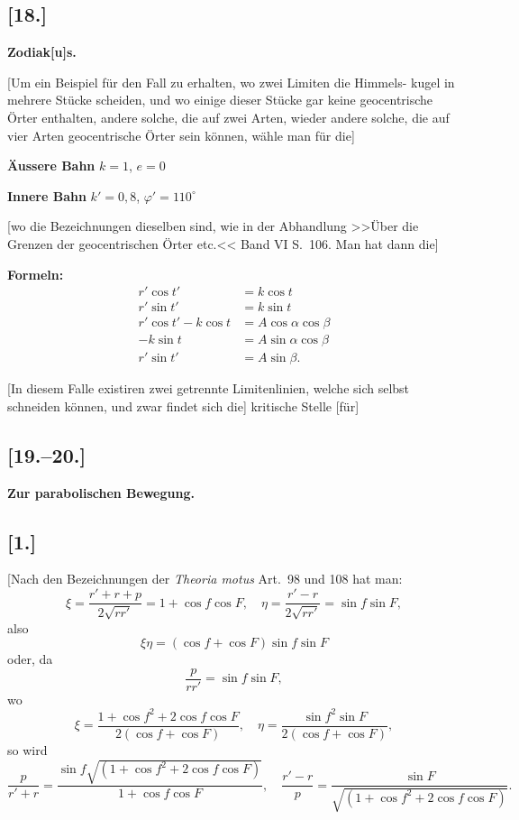 \documentclass[12pt,a4paper]{article}
\begin{document}
\subsection*{[18.]}
\textbf{Zodiak[u]s.}

[Um ein Beispiel f\"ur den Fall zu erhalten, wo zwei Limiten die Himmels-
kugel in mehrere St\"ucke scheiden, und wo einige dieser St\"ucke gar keine
geocentrische \"Orter enthalten, andere solche, die auf zwei Arten, wieder
andere solche, die auf vier Arten geocentrische \"Orter sein k\"onnen, w\"ahle man
f\"ur die]

\textbf{\"Aussere Bahn} $k = 1$, $e = 0$

\textbf{Innere Bahn} $k' = 0{,}8$, $\varphi' = 110^\circ$

[wo die Bezeichnungen dieselben sind, wie in der Abhandlung >>\"Uber die
Grenzen der geocentrischen \"Orter etc.<< Band VI S.~106. Man hat dann die]

\textbf{Formeln:}
\begin{align*}
r'\cos t' &= k\cos t \\
r'\sin t' &= k\sin t \\
r'\cos t' - k\cos t &= A\cos\alpha\cos\beta \\
-k\sin t &= A\sin\alpha\cos\beta \\
r'\sin t' &= A\sin\beta.
\end{align*}

[In diesem Falle existiren zwei getrennte Limitenlinien, welche sich selbst
schneiden k\"onnen, und zwar findet sich die] kritische Stelle [f\"ur]

\newpage

\subsection*{[19.--20.]}
\textbf{Zur parabolischen Bewegung.}

\subsection*{[1.]}
[Nach den Bezeichnungen der \textit{Theoria motus} Art.~98 und 108 hat man:
\[
\xi = \frac{r' + r + p}{2\sqrt{rr'}} = 1 + \cos f\cos F, \quad \eta = \frac{r' - r}{2\sqrt{rr'}} = \sin f\sin F,
\]
also
\[
\xi\eta = (\cos f + \cos F)\sin f\sin F
\]
oder, da
\[
\frac{p}{rr'} = \sin f\sin F,
\]
wo
\[
\xi = \frac{1 + \cos f^2 + 2\cos f\cos F}{2(\cos f + \cos F)}, \quad \eta = \frac{\sin f^2\sin F}{2(\cos f + \cos F)},
\]
so wird
\[
\frac{p}{r' + r} = \frac{\sin f\sqrt{(1 + \cos f^2 + 2\cos f\cos F)}}{1 + \cos f\cos F}, \quad \frac{r' - r}{p} = \frac{\sin F}{\sqrt{(1 + \cos f^2 + 2\cos f\cos F)}}.
\]
\end{document}
